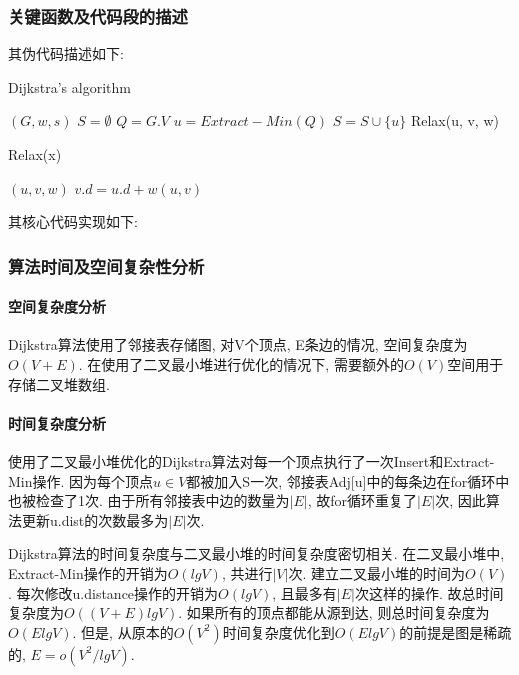 \subsubsection{关键函数及代码段的描述}
其伪代码描述如下:
\begin{algorithm}
	\caption{Dijkstra's algorithm}\label{alg:dijkstra}
	\begin{algorithmic}
		\Require $(G, w, s)$
		\State $S = \emptyset$
		\State $Q = G.V$
		\State $u = Extract-Min(Q)$
		\State $S = S \cup \{u\}$
		\State Relax(u, v, w)
		\EndFor
		\EndWhile
	\end{algorithmic}
\end{algorithm}

\begin{algorithm}
	\caption{Relax(x)}
	\begin{algorithmic}
		\Require $(u, v, w)$
		\If{$v.d > u.d + w(u, v)$}
		\State $v.d = u.d + w(u, v)$
		\EndIf
	\end{algorithmic}
\end{algorithm}

其核心代码实现如下:


\subsubsection{算法时间及空间复杂性分析}
\paragraph{空间复杂度分析}
Dijkstra算法使用了邻接表存储图, 对V个顶点, E条边的情况, 空间复杂度为$O(V+E)$.
在使用了二叉最小堆进行优化的情况下, 需要额外的$O(V)$空间用于存储二叉堆数组.

\paragraph{时间复杂度分析}
使用了二叉最小堆优化的Dijkstra算法对每一个顶点执行了一次Insert和Extract-Min操作.
因为每个顶点$u\in V$都被加入S一次,
邻接表Adj[u]中的每条边在for循环中也被检查了1次. 由于所有邻接表中边的数量为$|E|$,
故for循环重复了$|E|$次, 因此算法更新u.dist的次数最多为$|E|$次.\par

Dijkstra算法的时间复杂度与二叉最小堆的时间复杂度密切相关.
在二叉最小堆中, Extract-Min操作的开销为$O(lgV)$, 共进行$|V|$次.
建立二叉最小堆的时间为$O(V)$. 每次修改u.distance操作的开销为$O(lgV)$,
且最多有$|E|$次这样的操作. 故总时间复杂度为$O((V+E)lgV)$.
如果所有的顶点都能从源到达, 则总时间复杂度为$O(ElgV)$. 但是,
从原本的$O(V^2)$时间复杂度优化到$O(ElgV)$的前提是图是稀疏的, $E=o(V^2/lgV)$.
